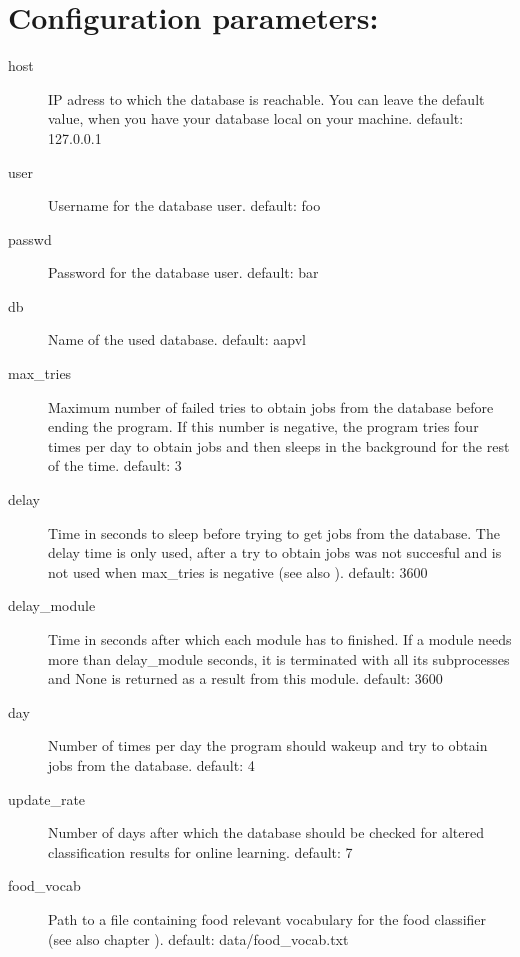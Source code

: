 \documentclass[letterpaper,10pt,english]{sphinxmanual}
\begin{document}
\section{Configuration parameters:}
\label{\detokenize{configuration:configuration-parameters}}\begin{description}
\item[{host}] \leavevmode
IP adress to which the database is reachable. You can leave the
default value, when you have your database local on your
machine. default: 127.0.0.1

\item[{user}] \leavevmode
Username for the database user. default: foo

\item[{passwd}] \leavevmode
Password for the database user. default: bar

\item[{db}] \leavevmode
Name of the used database. default: aapvl

\item[{max\_tries}] \leavevmode
Maximum number of failed tries to obtain jobs from the database before
ending the program. If this number is negative, the program tries four
times per day to obtain jobs and then sleeps in the background for the
rest of the time. default: 3

\item[{delay}] \leavevmode
Time in seconds to sleep before trying to get jobs from the
database. The delay time is only used, after a try to obtain jobs was
not succesful and is not used when max\_tries is negative (see also
). default: 3600

\item[{delay\_module}] \leavevmode
Time in seconds after which each module has to finished. If a module
needs more than delay\_module seconds, it is terminated with all its
subprocesses and None is returned as a result from this
module. default: 3600

\item[{day}] \leavevmode
Number of times per day the program should wakeup and try to obtain
jobs from the database. default: 4

\item[{update\_rate}] \leavevmode
Number of days after which the database should be checked for
altered classification results for online learning. default: 7

\item[{food\_vocab}] \leavevmode
Path to a file containing food relevant vocabulary for the food
classifier (see also chapter {\hyperref[\detokenize{external_data:external-food-vocab}]{}}). default:
data/food\_vocab.txt


\end{description}
\end{document}
